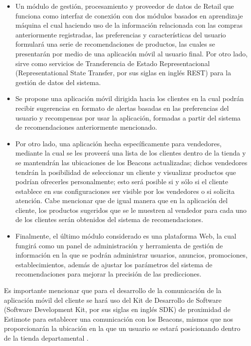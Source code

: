 \begin{itemize}
\item Un módulo de gestión, procesamiento  y proveedor de datos de Retail
que funciona como interfaz de conexión con dos módulos basados en aprendizaje máquina el cual haciendo uso de la información relacionada con las compras anteriormente registradas, las preferencias y características del usuario formulará una serie de recomendaciones de productos, las cuales se presentarán por medio de una aplicación móvil al usuario final. 
Por otro lado, sirve como servicios de Transferencia de Estado Representacional (Representational State Transfer, por sus siglas en inglés REST) para la gestión de datos del sistema. 


\item Se propone una aplicación móvil dirigida hacia los clientes en la cual podrán recibir sugerencias en formato de alertas basadas en las preferencias del usuario y recompensas por usar la aplicación, formadas a partir del sistema de recomendaciones anteriormente mencionado.

\item Por otro lado, una aplicación hecha específicamente para vendedores, mediante la cual se les proveerá una lista de los clientes dentro de la tienda y se mantendrán las ubicaciones de los Beacons actualizadas; dichos vendedores tendrán la posibilidad de seleccionar un cliente y visualizar productos que podrían ofrecerles personalmente; esto será posible si y sólo si el cliente establece en sus configuraciones ser visible por los vendedores o si solicita atención. Cabe mencionar que de igual manera que en la aplicación del cliente, los productos sugeridos que se le muestren al vendedor para cada uno de los clientes serán obtenidos del sistema de recomendaciones.

\item Finalmente, el último módulo considerado es una plataforma Web, la cual fungirá como un panel de administración y herramienta de gestión de información en la que se podrán administrar usuarios, anuncios, promociones, establecimientos, además de ajustar los parámetros del sistema de recomendaciones para mejorar la precisión de las predicciones. 
\end{itemize}

Es importante mencionar que para el desarrollo de la comunicación de la aplicación móvil del cliente se hará uso del Kit de Desarrollo de Software (Software Development Kit, por sus siglas en inglés SDK) de proximidad de Estimote para establecer una comunicación con los Beacons, mismos que nos proporcionarán la ubicación en la que un usuario se estará posicionando dentro de la tienda departamental \cite{google}. 
\\

